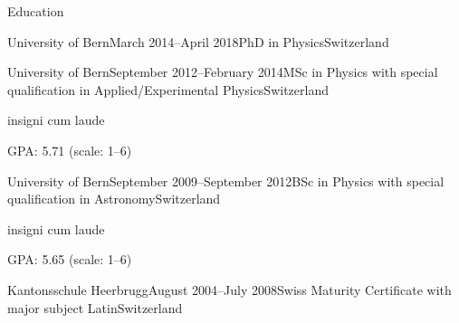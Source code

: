 \documentclass{resume} %
\begin{document}

\begin{rSection}{Education}
	\begin{nlSubsection}{University of Bern}{March 2014--April 2018}{PhD in Physics}{Switzerland}
	\end{nlSubsection}
	\begin{rSubsection}{University of Bern}{September 2012--February 2014}{MSc in Physics with special qualification in Applied/Experimental Physics}{Switzerland}
		\item insigni cum laude
		\item GPA: \num{5.71} (scale: \numrange{1}{6})
	\end{rSubsection}
	\begin{rSubsection}{University of Bern}{September 2009--September 2012}{BSc in Physics with special qualification in Astronomy}{Switzerland}
		\item insigni cum laude
		\item GPA: \num{5.65} (scale: \numrange{1}{6})
	\end{rSubsection}
	\begin{nlSubsection}{Kantonsschule Heerbrugg}{August 2004--July 2008}{Swiss Maturity Certificate with major subject Latin}{Switzerland}
	\end{nlSubsection}
\end{rSection}
\end{document}

